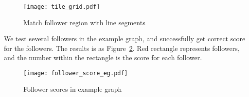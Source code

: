 \begin{figure}[htbp]
	  \centering
	  \texttt{[image: tile\_grid.pdf]}
	  \caption{Match follower region with line segments}
	  \label{tile_grid}
\end{figure}

We test several followers in the example graph, and successfully get correct score for the followers. The results is as Figure~\ref{follower_score_eg}. Red rectangle represents followers, and the number within the rectangle is the score for each follower.

\begin{figure}[htbp]
	  \centering
	  \texttt{[image: follower\_score\_eg.pdf]}
	  \caption{Follower scores in example graph}
	  \label{follower_score_eg}
\end{figure}
